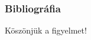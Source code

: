\begin{frame}
	\frametitle{Bibliográfia}
	
	
\end{frame}

\begin{frame}
		\Huge{\centerline{Köszönjük a figyelmet!}}
\end{frame}